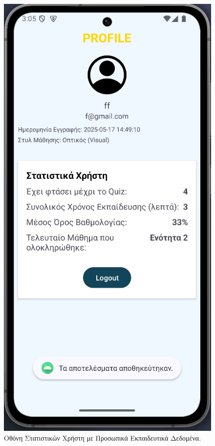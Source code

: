 \documentclass[11pt]{report}
\begin{document}
\begin{figure}[H]
  \centering
  \includegraphics[width=0.9\linewidth, height=0.35\textheight, keepaspectratio]{Figures/s9.png}
  \caption{Οθόνη Στατιστικών Χρήστη με Προσωπικά Εκπαιδευτικά Δεδομένα.}
\end{figure}
\end{document}
